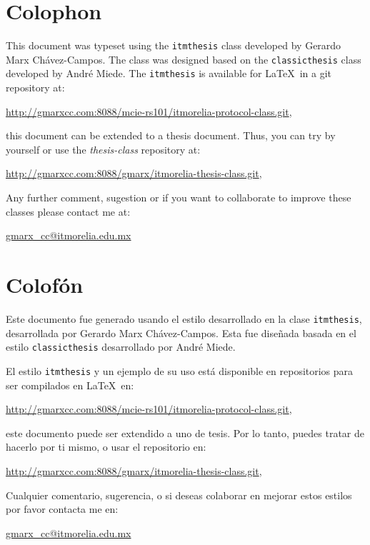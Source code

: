 
\pagestyle{empty}
\hfill
\vfill
{}
\section*{Colophon}

This document was typeset using the  \texttt{itmthesis} class developed by Gerardo Marx Chávez-Campos. The class was designed based on the \texttt{classicthesis} class developed by Andr\'e Miede. The \texttt{itmthesis} is available for \LaTeX\ in a git repository at: 

\begin{center}
\url{http://gmarxcc.com:8088/mcie-rs101/itmorelia-protocol-class.git}, 
\end{center}

this document can be extended to a thesis document. Thus, you can try by yourself or use the \textit{thesis-class} repository at:

\begin{center}
\url{http://gmarxcc.com:8088/gmarx/itmorelia-thesis-class.git}, 
\end{center}

\noindent Any further comment, sugestion or if you want to collaborate to improve these  classes please contact me at:

\href{mailto:gmarx\_cc@itmorelia.edu.mx}{gmarx\_cc@itmorelia.edu.mx} 

\section*{Colofón}

Este documento fue generado usando el estilo desarrollado en la clase \texttt{itmthesis}, desarrollada por Gerardo Marx Chávez-Campos. Esta  fue diseñada basada en el estilo \texttt{classicthesis} desarrollado por Andr\'e Miede. 

El estilo \texttt{itmthesis} y un ejemplo de su uso está disponible en repositorios para ser compilados en \LaTeX\ en: 

\begin{center}
\url{http://gmarxcc.com:8088/mcie-rs101/itmorelia-protocol-class.git}, 
\end{center}
este documento puede ser extendido a uno de tesis. Por lo tanto, puedes tratar de hacerlo por ti mismo, o usar el repositorio en:

\begin{center}
\url{http://gmarxcc.com:8088/gmarx/itmorelia-thesis-class.git}, 
\end{center}

\noindent Cualquier comentario, sugerencia, o si deseas colaborar en mejorar estos estilos por favor contacta me en:

\href{mailto:gmarx\_cc@itmorelia.edu.mx}{gmarx\_cc@itmorelia.edu.mx} 